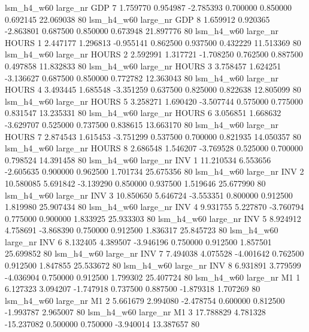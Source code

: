   lsm_h4_w60   large_nr      GDP                 7  1.759770  0.954987  -2.785393 0.700000 0.850000  0.692145   22.069038 80
  lsm_h4_w60   large_nr      GDP                 8  1.659912  0.920365  -2.863801 0.687500 0.850000  0.673948   21.897776 80
  lsm_h4_w60   large_nr    HOURS                 1  2.447177  1.296813  -0.955141 0.862500 0.937500  0.432229   11.513369 80
  lsm_h4_w60   large_nr    HOURS                 2  2.592991  1.317721  -1.708250 0.762500 0.887500  0.497858   11.832833 80
  lsm_h4_w60   large_nr    HOURS                 3  3.758457  1.624251  -3.136627 0.687500 0.850000  0.772782   12.363043 80
  lsm_h4_w60   large_nr    HOURS                 4  3.493445  1.685548  -3.351259 0.637500 0.825000  0.822638   12.805099 80
  lsm_h4_w60   large_nr    HOURS                 5  3.258271  1.690420  -3.507744 0.575000 0.775000  0.831547   13.235331 80
  lsm_h4_w60   large_nr    HOURS                 6  3.056851  1.668632  -3.629707 0.525000 0.737500  0.838615   13.663170 80
  lsm_h4_w60   large_nr    HOURS                 7  2.874543  1.615453  -3.751299 0.537500 0.700000  0.821935   14.050357 80
  lsm_h4_w60   large_nr    HOURS                 8  2.686548  1.546207  -3.769528 0.525000 0.700000  0.798524   14.391458 80
  lsm_h4_w60   large_nr      INV                 1 11.210534  6.553656  -2.605635 0.900000 0.962500  1.701734   25.675356 80
  lsm_h4_w60   large_nr      INV                 2 10.580085  5.691842  -3.139290 0.850000 0.937500  1.519646   25.677990 80
  lsm_h4_w60   large_nr      INV                 3 10.850650  5.646724  -3.553351 0.800000 0.912500  1.819980   25.907434 80
  lsm_h4_w60   large_nr      INV                 4  9.931755  5.227870  -3.760794 0.775000 0.900000  1.833925   25.933303 80
  lsm_h4_w60   large_nr      INV                 5  8.924912  4.758691  -3.868390 0.750000 0.912500  1.836317   25.845723 80
  lsm_h4_w60   large_nr      INV                 6  8.132405  4.389507  -3.946196 0.750000 0.912500  1.857501   25.699852 80
  lsm_h4_w60   large_nr      INV                 7  7.494038  4.075528  -4.001642 0.762500 0.912500  1.847855   25.533672 80
  lsm_h4_w60   large_nr      INV                 8  6.931891  3.779599  -4.036904 0.750000 0.912500  1.799302   25.407724 80
  lsm_h4_w60   large_nr       M1                 1  6.127323  3.094207  -1.747918 0.737500 0.887500 -1.879318    1.707269 80
  lsm_h4_w60   large_nr       M1                 2  5.661679  2.994080  -2.478754 0.600000 0.812500 -1.993787    2.965007 80
  lsm_h4_w60   large_nr       M1                 3 17.788829  4.781328 -15.237082 0.500000 0.750000 -3.940014   13.387657 80
